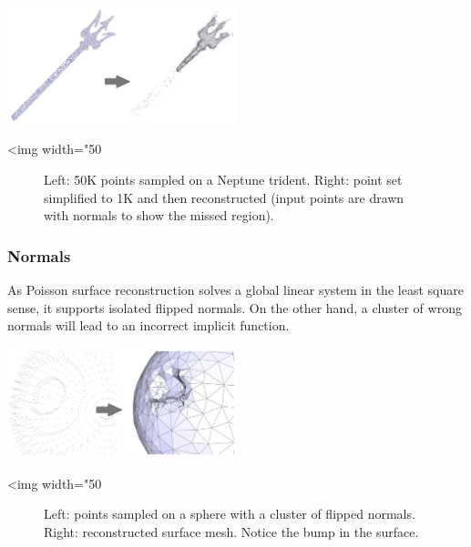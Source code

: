 \begin{center}
    \label{Surface_reconstruction_points_3-fig-sampling}
    \begin{ccTexOnly}
      \includegraphics[width=0.5\textwidth]{Surface_reconstruction_points_3/sampling} %
    \end{ccTexOnly}
    \begin{ccHtmlOnly}
        <img width="50%
    \end{ccHtmlOnly}
    \begin{figure}[h]
        \caption{Left: 50K points sampled on a Neptune trident.
                 Right: point set simplified to 1K and then reconstructed
                 (input points are drawn with normals to show the missed region).}
    \end{figure}
\end{center}


\subsubsection{Normals}

As Poisson surface reconstruction solves a global linear system in the least square sense, it supports isolated flipped normals.
On the other hand, a cluster of wrong normals will lead to an incorrect implicit function.

\begin{center}
    \label{Surface_reconstruction_points_3-fig-flipped_normals}
    \begin{ccTexOnly}
      \includegraphics[width=0.5\textwidth]{Surface_reconstruction_points_3/flipped_normals} %
    \end{ccTexOnly}
    \begin{ccHtmlOnly}
        <img width="50%
    \end{ccHtmlOnly}
    \begin{figure}[h]
        \caption{Left: points sampled on a sphere with a cluster of flipped normals.
                 Right: reconstructed surface mesh. Notice the bump in the surface.}
    \end{figure}
\end{center}


